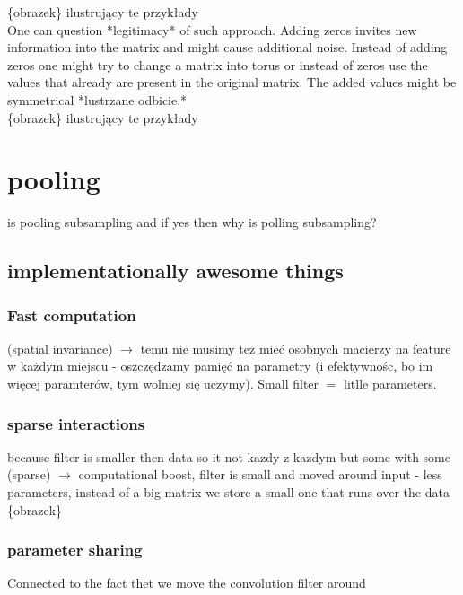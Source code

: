 \documentclass[a4paper,10pt]{report}
\begin{document}
      \{obrazek\} ilustrujący te przykłady \\
	  
      One can question *legitimacy* of such approach. Adding zeros invites new information into the matrix and might cause additional noise. Instead of adding zeros one might try to change a matrix into torus or instead of zeros use the values that already are present in the original matrix. The added values might be symmetrical *lustrzane odbicie.*\\
	  
      \{obrazek\} ilustrujący te przykłady 
      
    \section{pooling}	  
      is pooling subsampling and if yes then why is polling subsampling?\\
      
      \subsection{implementationally awesome things} %
      
	\subsubsection{Fast computation}
	  (spatial invariance) $\rightarrow$ temu nie musimy też mieć osobnych macierzy na feature w każdym miejscu - oszczędzamy pamięć na parametry (i efektywnośc, bo im więcej paramterów, tym wolniej się uczymy). Small filter $=$ litlle parameters.\\
	
	\subsubsection{sparse interactions} %
	  because filter is smaller then data so it not kazdy z kazdym but some with some (sparse) $\rightarrow$ computational boost, filter is small and moved around input - less parameters, instead of a big matrix we store a small one that runs over the data\\
	  
	  \{obrazek\} %
	  
	\subsubsection{parameter sharing} %
	  Connected to the fact thet we move the convolution filter around \\
	  
\end{document}
